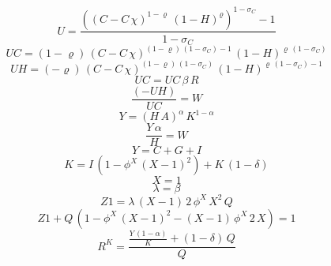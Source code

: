 \begin{dmath}
{U}=\frac{\left(\left({C}-{C}\, {{\chi}}\right)^{1-{{\varrho}}}\, \left(1-{H}\right)^{{{\varrho}}}\right)^{1-{{\sigma_{C}}}}-1}{1-{{\sigma_{C}}}}
\end{dmath}
\begin{dmath}
{UC}=\left(1-{{\varrho}}\right)\, \left({C}-{C}\, {{\chi}}\right)^{\left(1-{{\varrho}}\right)\, \left(1-{{\sigma_{C}}}\right)-1}\, \left(1-{H}\right)^{{{\varrho}}\, \left(1-{{\sigma_{C}}}\right)}
\end{dmath}
\begin{dmath}
{UH}=\left(-{{\varrho}}\right)\, \left({C}-{C}\, {{\chi}}\right)^{\left(1-{{\varrho}}\right)\, \left(1-{{\sigma_{C}}}\right)}\, \left(1-{H}\right)^{{{\varrho}}\, \left(1-{{\sigma_{C}}}\right)-1}
\end{dmath}
\begin{dmath}
{UC}={UC}\, {{\beta}}\, {R}
\end{dmath}
\begin{dmath}
\frac{\left(-{UH}\right)}{{UC}}={W}
\end{dmath}
\begin{dmath}
{Y}=\left({H}\, {A}\right)^{{{\alpha}}}\, {K}^{1-{{\alpha}}}
\end{dmath}
\begin{dmath}
\frac{{Y}\, {{\alpha}}}{{H}}={W}
\end{dmath}
\begin{dmath}
{Y}={C}+{G}+{I}
\end{dmath}
\begin{dmath}
{K}={I}\, \left(1-{{\phi^X}}\, \left({X}-1\right)^{2}\right)+{K}\, \left(1-{{\delta}}\right)
\end{dmath}
\begin{dmath}
{X}=1
\end{dmath}
\begin{dmath}
{\lambda}={{\beta}}
\end{dmath}
\begin{dmath}
{Z1}={\lambda}\, \left({X}-1\right)\, 2\, {{\phi^X}}\, {X}^{2}\, {Q}
\end{dmath}
\begin{dmath}
{Z1}+{Q}\, \left(1-{{\phi^X}}\, \left({X}-1\right)^{2}-\left({X}-1\right)\, {{\phi^X}}\, 2\, {X}\right)=1
\end{dmath}
\begin{dmath}
{R^{K}}=\frac{\frac{{Y}\, \left(1-{{\alpha}}\right)}{{K}}+\left(1-{{\delta}}\right)\, {Q}}{{Q}}
\end{dmath}
